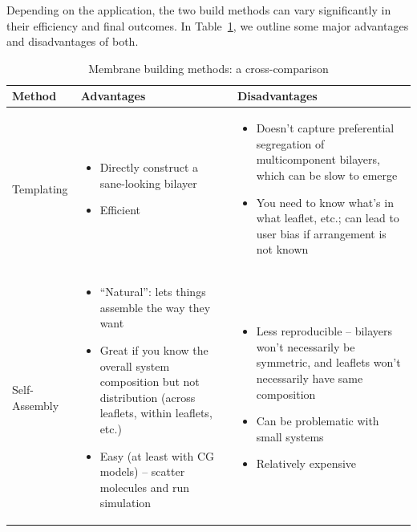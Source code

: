 \documentclass[9pt,bestpractices]{livecoms}
\begin{document}
Depending on the application, the two build methods can vary significantly in their efficiency and final outcomes.
In Table~\ref{tab:buildmtds}, we outline some major advantages and disadvantages of both.

\begin{table}[t]
\centering
\caption{Membrane building methods: a cross-comparison}
\label{tab:buildmtds}
\begin{tabularx}{\linewidth}{| l | X | X |}
\hline
\textbf{Method} & \textbf{Advantages} & \textbf{Disadvantages} \\
\hline
Templating & \begin{minipage}[t]{\linewidth} \begin{itemize}[nosep,after=\strut] \item Directly construct a sane-looking bilayer \item Efficient \end{itemize} \end{minipage} & \begin{minipage}[t]{\linewidth} \begin{itemize}[nosep,after=\strut] \item Doesn't capture preferential segregation of multicomponent bilayers, which can be slow to emerge \item You need to know what's in what leaflet, etc.; can lead to user bias if arrangement is not known \end{itemize} \end{minipage} \\
\hline
Self-Assembly & \begin{minipage}[t]{\linewidth} \begin{itemize}[nosep,after=\strut] \item ``Natural'': lets things assemble the way they want \item Great if you know the overall system composition but not distribution (across leaflets, within leaflets, etc.) \item Easy (at least with CG models) -- scatter molecules and run simulation \end{itemize} \end{minipage} & \begin{minipage}[t]{\linewidth} \begin{itemize}[nosep,after=\strut] \item Less reproducible -- bilayers won't necessarily be symmetric, and leaflets won't necessarily have same composition \item Can be problematic with small systems \item Relatively expensive \end{itemize} \end{minipage} \\
\hline
\end{tabularx}
\end{table}
\end{document}
